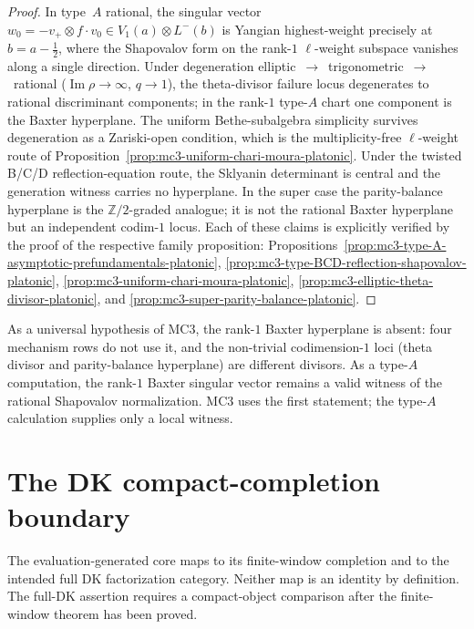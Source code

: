 \begin{proof}
In type~$A$ rational, the singular vector
$w_0 = -v_+ \otimes f \cdot v_0 \in V_1(a) \otimes L^-(b)$ is
Yangian highest-weight precisely at $b = a - \tfrac12$, where the
Shapovalov form on the rank-$1$ $\ell$-weight subspace vanishes
along a single direction. Under degeneration
elliptic~$\to$~trigonometric~$\to$~rational
($\operatorname{Im}\rho \to\infty$, $q \to 1$), the theta-divisor
failure locus degenerates to rational discriminant components; in the
rank-$1$ type-$A$ chart one component is the Baxter hyperplane. The
uniform Bethe-subalgebra simplicity survives degeneration as a
Zariski-open condition, which is the
multiplicity-free $\ell$-weight route of
Proposition~\ref{prop:mc3-uniform-chari-moura-platonic}. Under the twisted
B/C/D reflection-equation route, the Sklyanin determinant is
central and the generation witness carries no hyperplane. In the
super case the parity-balance hyperplane is the
$\mathbb{Z}/2$-graded analogue; it is not the rational Baxter
hyperplane but an independent codim-$1$ locus.
Each of these claims is explicitly verified by the proof of the
respective family proposition:
Propositions~\ref{prop:mc3-type-A-asymptotic-prefundamentals-platonic},
\ref{prop:mc3-type-BCD-reflection-shapovalov-platonic},
\ref{prop:mc3-uniform-chari-moura-platonic},
\ref{prop:mc3-elliptic-theta-divisor-platonic}, and
\ref{prop:mc3-super-parity-balance-platonic}.
\end{proof}

\begin{remark}
\label{rem:baxter-retraction-meaning}
As a universal hypothesis of MC3, the rank-$1$ Baxter hyperplane is
absent: four mechanism rows do not use it, and the non-trivial
codimension-$1$ loci (theta divisor and parity-balance hyperplane) are
different divisors. As a type-$A$ computation, the rank-$1$ Baxter
singular vector remains a valid witness of the rational Shapovalov
normalization. MC3 uses the first statement; the type-$A$ calculation
supplies only a local witness.
\end{remark}

\section{The DK compact-completion boundary}
\label{sec:mc3-platonic-dk-compact-completion-boundary}

The evaluation-generated core maps to its finite-window completion and
to the intended full DK factorization category. Neither map is an
identity by definition. The full-DK assertion requires a compact-object
comparison after the finite-window theorem has been proved.

